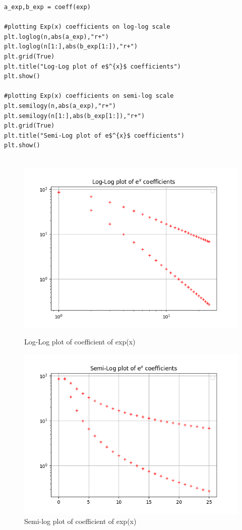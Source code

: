 \documentclass[a4paper]{article}
\begin{document}
\begin{lstlisting}
a_exp,b_exp = coeff(exp)

#plotting Exp(x) coefficients on log-log scale
plt.loglog(n,abs(a_exp),"r+")
plt.loglog(n[1:],abs(b_exp[1:]),"r+")
plt.grid(True)
plt.title("Log-Log plot of e$^{x}$ coefficients")
plt.show()

#plotting Exp(x) coefficients on semi-log scale
plt.semilogy(n,abs(a_exp),"r+")
plt.semilogy(n[1:],abs(b_exp[1:]),"r+")
plt.grid(True)
plt.title("Semi-Log plot of e$^{x}$ coefficients")
plt.show()


\end{lstlisting}
\begin{figure}
\includegraphics[width=\columnwidth]{coeffllexpx.png}
\caption{Log-Log plot of coefficient of exp(x)}
\includegraphics[width=\columnwidth]{coeffslexpx.png}
\caption{Semi-log plot of coefficient of exp(x)}
\end{figure}
\end{document}
